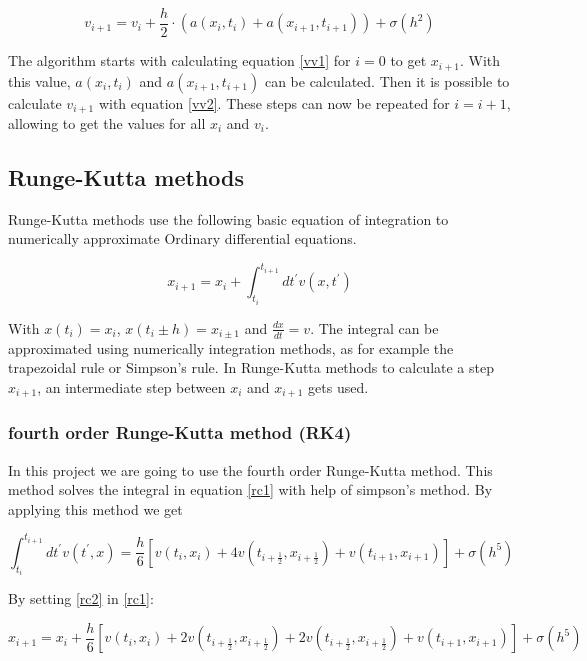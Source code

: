 \documentclass[10pt,a4paper]{article}
\begin{document}
\begin{equation}
\label{vv2}
v_{i+1} = v_i + \frac{h}{2} \cdot (a(x_i, t_i) + a(x_{i+1}, t_{i+1})) + \sigma(h^2)
\end{equation}

The algorithm starts with calculating equation \eqref{vv1} for $i = 0$ to get $x_{i+1}$. With this value, $a(x_i, t_i)$ and $a(x_{i+1}, t_{i+1})$ can be calculated. Then it is possible to calculate $v_{i+1}$ with equation \eqref{vv2}. These steps can now be repeated for $i = i+1$, allowing to get the values for all $x_i$ and $v_i$.

\subsection{Runge-Kutta methods}

Runge-Kutta methods use the following basic equation of integration to numerically approximate Ordinary differential equations.

\begin{equation}
\label{rc1}
x_{i+1} = x_i + \int_{t_i}^{t_{i+1}} dt^{'} v(x, t^{'})
\end{equation}

With $x(t_i) = x_i$, $x(t_i \pm h) = x_{i \pm 1}$ and $\frac{dx}{dt} = v$. The integral can be approximated using numerically integration methods, as for example the trapezoidal rule or Simpson's rule. In Runge-Kutta methods to calculate a step $x_{i+1}$, an intermediate step between $x_i$ and $x_{i+1}$ gets used.

\subsubsection{fourth order Runge-Kutta method (RK4)}
\label{subsubsec:rc4}

In this project we are going to use the fourth order Runge-Kutta method. This method solves the integral in equation \eqref{rc1} with help of simpson's method. By applying this method we get

\begin{equation}
\label{rc2}
\int_{t_i}^{t_{i+1}} dt^{'} v(t^{'}, x) = \frac{h}{6} [v(t_i, x_i) +4 v(t_{i+\frac{1}{2}}, x_{i+\frac{1}{2}}) + v(t_{i+1}, x_{i+1})] + \sigma(h^5)
\end{equation}

By setting \eqref{rc2} in \eqref{rc1}:

\begin{equation}
\label{rc3}
x_{i+1} = x_i + \frac{h}{6} [v(t_i, x_i) + 2 v(t_{i+\frac{1}{2}}, x_{i+\frac{1}{2}}) + 2 v(t_{i+\frac{1}{2}}, x_{i+\frac{1}{2}}) + v(t_{i+1}, x_{i+1})] + \sigma(h^5)
\end{equation}
\end{document}

